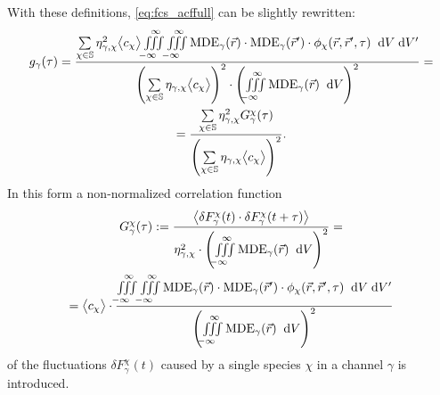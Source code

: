 \noindent With these definitions, \eqref{eq:fcs_acffull} can be slightly rewritten:
\begin{multline}\label{eq:fcs_acffull_phifactor}
  g_\gamma(\tau)=\frac{\sum\limits_{\chi\in\mathbb{S}}\eta_{\gamma,\chi}^2 \bigl\langle c_\chi\bigr\rangle\iiint\limits_{-\infty\ \ }^{\ \ \infty}\iiint\limits_{-\infty\ \ }^{\ \ \infty}\operatorname{MDE}_\gamma(\vec{r})\cdot\operatorname{MDE}_\gamma(\vec{r}')\cdot\phi_\chi(\vec{r},\vec{r}',\tau)\;\;\mathrm{d}V\;\mathrm{d}V' }{\left(\sum\limits_{\chi\in\mathbb{S}}\eta_{\gamma,\chi} \bigl\langle c_\chi\bigr\rangle\right)^2\cdot\left(\iiint\limits_{-\infty\ \ }^{\ \ \infty}\operatorname{MDE}_\gamma(\vec{r})\;\;\mathrm{d}V\right)^2}=\\
  =\frac{\sum\limits_{\chi\in\mathbb{S}}\eta_{\gamma,\chi}^2 G_{\gamma}^{\chi}(\tau) }{\left(\sum\limits_{\chi\in\mathbb{S}}\eta_{\gamma,\chi} \bigl\langle c_\chi\bigr\rangle\right)^2}.
\end{multline}
In this form a non-normalized correlation function
\begin{multline}\label{eq:fcs_nnormacf}
  G_{\gamma}^{\chi}(\tau):=\frac{\left\langle \delta F_\gamma^{\chi}(t)\cdot\delta F_\gamma^{\chi}(t+\tau)\right\rangle}{\eta_{\gamma,\chi}^2\cdot\left(\iiint\limits_{-\infty\ \ }^{\ \ \infty}\operatorname{MDE}_\gamma(\vec{r})\;\;\mathrm{d}V\right)^2}=\\
  =\bigl\langle c_\chi\bigr\rangle\cdot\frac{\iiint\limits_{-\infty\ \ }^{\ \ \infty}\iiint\limits_{-\infty\ \ }^{\ \ \infty}\operatorname{MDE}_\gamma(\vec{r})\cdot\operatorname{MDE}_\gamma(\vec{r}')\cdot\phi_\chi(\vec{r},\vec{r}',\tau)\;\;\mathrm{d}V\;\mathrm{d}V'}{\left(\iiint\limits_{-\infty\ \ }^{\ \ \infty}\operatorname{MDE}_\gamma(\vec{r})\;\;\mathrm{d}V\right)^2}
\end{multline}
of the fluctuations $\delta F_\gamma^{\chi}(t)$ caused by a single species $\chi$ in a channel $\gamma$ is introduced.


